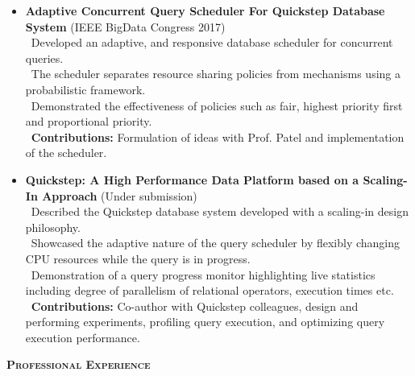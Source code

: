\documentclass[11pt]{article}
\newcommand{\graybox}[1]{\begin{mdframed}[backgroundcolor=light-gray, linecolor=light-gray, roundcorner=10pt, shadow=false, shadowsize=1pt]
\Large{\textbf{\textsc{#1}}}
\end{mdframed}}
\begin{document}
\begin{itemize}\addtolength{\itemsep}{-0.5\baselineskip}
\item{\textbf{Adaptive Concurrent Query Scheduler For Quickstep Database System} (IEEE BigData Congress 2017)}\\
		\textendash\ Developed an adaptive, and responsive database scheduler for concurrent queries.\\
		\textendash\ The scheduler separates resource sharing policies from mechanisms using a probabilistic framework. \\
		\textendash\ Demonstrated the effectiveness of policies such as fair, highest priority first and proportional priority.\\
		\textendash\ \textbf{Contributions:} Formulation of ideas with Prof. Patel and implementation of the scheduler.\\
\item{\textbf{Quickstep: A High Performance Data Platform based
on a Scaling-In Approach} (Under submission)}	\\
		\textendash\ Described the Quickstep database system developed with a scaling-in design philosophy.\\
		\textendash\ Showcased the adaptive nature of the query scheduler by flexibly changing CPU resources while the query is in progress. \\
		\textendash\ Demonstration of a query progress monitor highlighting live statistics including degree of parallelism of relational operators, execution times etc.\\
		\textendash\ \textbf{Contributions:} Co-author with Quickstep colleagues, design and performing experiments, profiling query execution, and optimizing query execution performance.
\end{itemize}
\graybox{Professional Experience}
\end{document}
